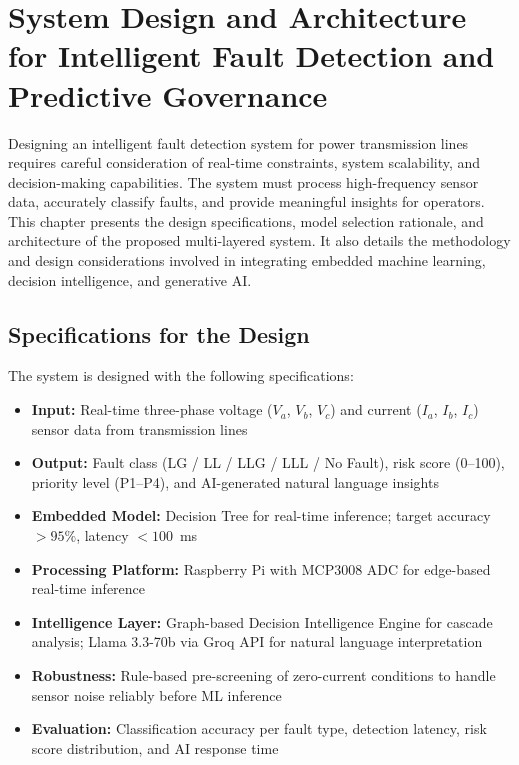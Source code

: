 
\chapter{System Design and Architecture for Intelligent Fault Detection and Predictive Governance}

Designing an intelligent fault detection system for power transmission lines requires careful consideration of real-time constraints, system scalability, and decision-making capabilities. The system must process high-frequency sensor data, accurately classify faults, and provide meaningful insights for operators. This chapter presents the design specifications, model selection rationale, and architecture of the proposed multi-layered system. It also details the methodology and design considerations involved in integrating embedded machine learning, decision intelligence, and generative AI.

\section{Specifications for the Design}

The system is designed with the following specifications:
\begin{itemize}[label=$\diamond$]
\setlength{\itemsep}{0pt}
\setlength{\parskip}{0pt}
\setlength{\parsep}{0pt}
\item \textbf{Input:} Real-time three-phase voltage ($V_a$, $V_b$, $V_c$) and current ($I_a$, $I_b$, $I_c$) sensor data from transmission lines
\item \textbf{Output:} Fault class (LG / LL / LLG / LLL / No Fault), risk score (0--100), priority level (P1--P4), and AI-generated natural language insights
\item \textbf{Embedded Model:} Decision Tree for real-time inference; target accuracy $> 95\%$, latency $< 100$~ms
\item \textbf{Processing Platform:} Raspberry Pi with MCP3008 ADC for edge-based real-time inference
\item \textbf{Intelligence Layer:} Graph-based Decision Intelligence Engine for cascade analysis; Llama 3.3-70b via Groq API for natural language interpretation
\item \textbf{Robustness:} Rule-based pre-screening of zero-current conditions to handle sensor noise reliably before ML inference
\item \textbf{Evaluation:} Classification accuracy per fault type, detection latency, risk score distribution, and AI response time
\end{itemize}

